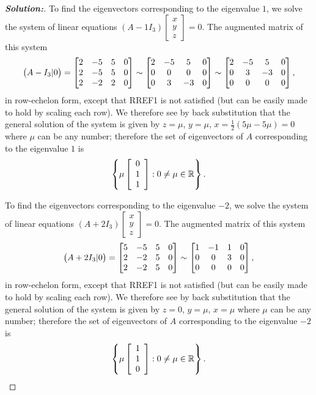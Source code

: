 \documentclass[a4paper]{amsart}
\theoremstyle{definition}
\newenvironment{solution}{\begin{proof}[\textbf{Solution:}] \vphantom{u}}{\end{proof}}
\begin{document}
\begin{solution}
 To find the eigenvectors corresponding to the eigenvalue $1$, we
 solve the system of linear equations $(A - 1I_3)\left[
 \begin{array}{c}x \\ y\\z
 \end{array} \right] = 0$. The augmented matrix of this system
 \[
 \big(A - I_3|0\big) = \left[\begin{matrix} 2 & -5 & 5 &0\\
     2 & -5 & 5 &0\\
     2 & -2 & 2&0\end{matrix}\right] \sim
 \left[\begin{matrix} 2 & -5 & 5 &0\\
     0 & 0 & 0 &0\\
     0 & 3 & -3&0\end{matrix}\right] \sim
 \left[\begin{matrix} 2 & -5 & 5 &0\\
     0 & 3 & -3 &0\\
     0 & 0 & 0&0\end{matrix}\right],
 \]
 in row-echelon form, except that RREF1 is not satisfied (but
 can be easily made to hold by scaling each row).
 We therefore see by back substitution that
 the general solution of the system is given by $z = \mu$, $y =
 \mu$, $x = \frac{1}{2}(5\mu - 5\mu) = 0$ where $\mu$ can be any
 number; therefore the set of eigenvectors of $A$ corresponding to
 the eigenvalue $1$ is
 \[
 \left\{ \mu \left[ \begin{array}{c} 0\\1\\1
 \end{array} \right] : 0 \neq \mu \in {\mathbb{R}} \right\}.
 \]

 To find the eigenvectors corresponding to the eigenvalue $-2$, we
 solve the system of linear equations $(A + 2I_3)\left[
 \begin{array}{c}x \\ y\\z
 \end{array} \right] = 0$. The augmented matrix of this system
 \[
 \big(A +2 I_3|0\big) = \left[\begin{matrix} 5 & -5 & 5 &0\\
     2 & -2 & 5 &0\\
     2 & -2 & 5&0\end{matrix}\right] \sim
 \left[\begin{matrix} 1 & -1 & 1 &0\\
     0 & 0 & 3 &0\\
     0 & 0 & 0&0\end{matrix}\right],
 \]
 in row-echelon form, except that RREF1 is not satisfied (but
 can be easily made to hold by scaling each row).
 We therefore see by back substitution that
 the general solution of the system is given by $z = 0$, $y = \mu$,
 $x = \mu$ where $\mu$ can be any number; therefore the set of
 eigenvectors of $A$ corresponding to the eigenvalue $-2$ is
 \[
 \left\{ \mu \left[ \begin{array}{c} 1\\1\\0
 \end{array} \right] : 0 \neq \mu \in {\mathbb{R}} \right\}.
 \]


\end{solution}
\end{document}
